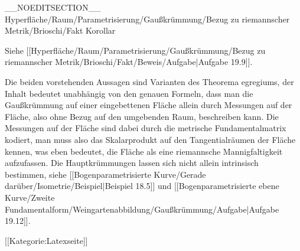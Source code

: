 __NOEDITSECTION__
{Hyperfläche/Raum/Parametrisierung/Gaußkrümmung/Bezug zu riemannscher Metrik/Brioschi/Fakt}
{Korollar}
{}
{

\faktzusatz {}
\faktzusatz {}

 }
{ Siehe [[Hyperfläche/Raum/Parametrisierung/Gaußkrümmung/Bezug zu riemannscher Metrik/Brioschi/Fakt/Beweis/Aufgabe|Aufgabe 19.9]]. }

Die beiden vorstehenden Aussagen sind Varianten des Theorema egregiums, der Inhalt bedeutet unabhängig von den genauen Formeln, dass man die Gaußkrümmung auf einer eingebettenen Fläche allein durch Messungen auf der Fläche, also ohne Bezug auf den umgebenden Raum,  beschreiben kann. Die Messungen auf der Fläche sind dabei durch die metrische Fundamentalmatrix kodiert, man muss also das Skalarprodukt auf den Tangentialräumen der Fläche kennen, was eben bedeutet, die Fläche als eine riemannsche Mannigfaltigkeit aufzufassen. Die Hauptkrümmungen lassen sich nicht allein intrinsisch bestimmen, siehe
[[Bogenparametrisierte Kurve/Gerade darüber/Isometrie/Beispiel|Beispiel 18.5]]
und
[[Bogenparametrisierte ebene Kurve/Zweite Fundamentalform/Weingartenabbildung/Gaußkrümmung/Aufgabe|Aufgabe 19.12]].

 [[Kategorie:Latexseite]]
